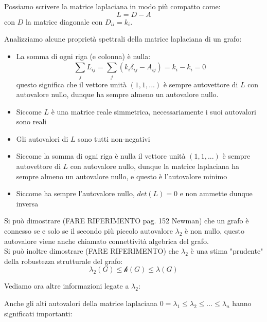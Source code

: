 Possiamo scrivere la matrice laplaciana in modo più compatto come:
\begin{equation}
  L=D-A
\end{equation}
con $D$ la matrice diagonale con $D_{ii}=k_i$.

Analizziamo alcune proprietà spettrali della matrice laplaciana di un grafo:
\begin{itemize}
  \item La somma di ogni riga (e colonna) è nulla:
  \begin{equation}
    \sum_{j}^{}L_{ij}=\sum_{j}^{}(k_i\delta_{ij}-A_{ij})=k_i-k_i=0
  \end{equation}
questo significa che il vettore unità $(1,1,...)$ è sempre autovettore di $L$ con autovalore nullo, dunque ha sempre almeno un autovalore nullo.
  \item Siccome $L$ è una matrice reale simmetrica, necessariamente i suoi autovalori sono reali 
  \item Gli autovalori di $L$ sono tutti non-negativi
  \item Siccome la somma di ogni riga è nulla il vettore unità $(1,1,...)$ è sempre autovettore di $L$ con autovalore nullo, dunque la matrice laplaciana ha sempre almeno un autovalore nullo, e questo è l'autovalore minimo
  \item Siccome ha sempre l'autovalore nullo, $det(L)=0$ e non ammette dunque inversa
\end{itemize}

Si può dimostrare (FARE RIFERIMENTO pag. 152 Newman) che un grafo è connesso se e solo se il secondo più piccolo autovalore $\lambda_2$ è non nullo, questo autovalore viene anche chiamato connettività algebrica del grafo.\\

Si può inoltre dimostrare (FARE RIFERIMENTO) che $\lambda_2$ è una stima "prudente" della robustezza strutturale del grafo:
\begin{equation}
  \lambda_2(G) \le \mathcal{k}(G) \le \lambda (G)
\end{equation}

Vediamo ora altre informazioni legate a $\lambda_2$:

\begin{boxb}

\end{boxb}
Anche gli alti autovalori della matrice laplaciana $0=\lambda_1 \le \lambda_2 \le ... \le \lambda_n$ hanno significati importanti:\\

